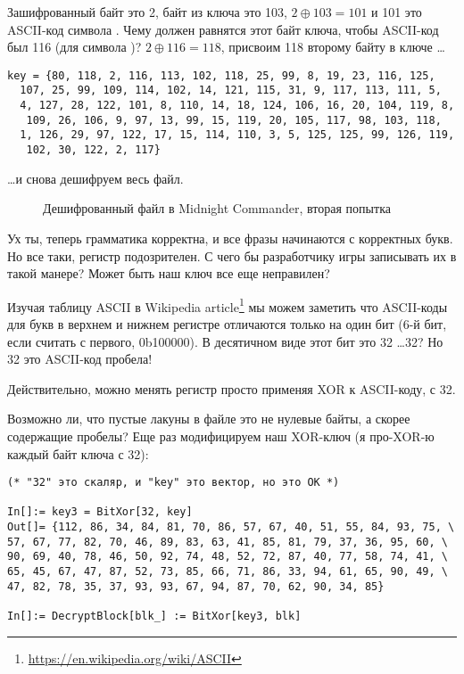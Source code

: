 Зашифрованный байт это 2, байт из ключа это 103, $2 \oplus 103=101$ и 101 это ASCII-код символа .
Чему должен равнятся этот байт ключа, чтобы ASCII-код был 116 (для символа  )?
$2 \oplus 116=118$, присвоим 118 второму байту в ключе \dots

\begin{lstlisting}[style=custommath]
key = {80, 118, 2, 116, 113, 102, 118, 25, 99, 8, 19, 23, 116, 125, 
  107, 25, 99, 109, 114, 102, 14, 121, 115, 31, 9, 117, 113, 111, 5, 
  4, 127, 28, 122, 101, 8, 110, 14, 18, 124, 106, 16, 20, 104, 119, 8,
   109, 26, 106, 9, 97, 13, 99, 15, 119, 20, 105, 117, 98, 103, 118, 
  1, 126, 29, 97, 122, 17, 15, 114, 110, 3, 5, 125, 125, 99, 126, 119,
   102, 30, 122, 2, 117}
\end{lstlisting}

\dots и снова дешифруем весь файл.

\begin{figure}[H]
\centering
{}
\caption{Дешифрованный файл в Midnight Commander, вторая попытка}
\end{figure}

Ух ты, теперь грамматика корректна, и все фразы начинаются с корректных букв.
Но все таки, регистр подозрителен.
С чего бы разработчику игры записывать их в такой манере?
Может быть наш ключ все еще неправилен?

Изучая таблицу ASCII в Wikipedia article\footnote{\url{https://en.wikipedia.org/wiki/ASCII}}
мы можем заметить что ASCII-коды для букв в верхнем и нижнем регистре отличаются только на один бит
(6-й бит, если считать с первого, 0b100000).
В десятичном виде этот бит это 32 \dots 32?
Но 32 это ASCII-код пробела!

Действительно, можно менять регистр просто применяя XOR к ASCII-коду, с 32.

Возможно ли, что пустые лакуны в файле это не нулевые байты, а скорее содержащие пробелы?
Еще раз модифицируем наш XOR-ключ (я про-XOR-ю каждый байт ключа с 32):

\begin{lstlisting}[style=custommath]
(* "32" это скаляр, и "key" это вектор, но это OK *)

In[]:= key3 = BitXor[32, key]
Out[]= {112, 86, 34, 84, 81, 70, 86, 57, 67, 40, 51, 55, 84, 93, 75, \
57, 67, 77, 82, 70, 46, 89, 83, 63, 41, 85, 81, 79, 37, 36, 95, 60, \
90, 69, 40, 78, 46, 50, 92, 74, 48, 52, 72, 87, 40, 77, 58, 74, 41, \
65, 45, 67, 47, 87, 52, 73, 85, 66, 71, 86, 33, 94, 61, 65, 90, 49, \
47, 82, 78, 35, 37, 93, 93, 67, 94, 87, 70, 62, 90, 34, 85}

In[]:= DecryptBlock[blk_] := BitXor[key3, blk]
\end{lstlisting}


